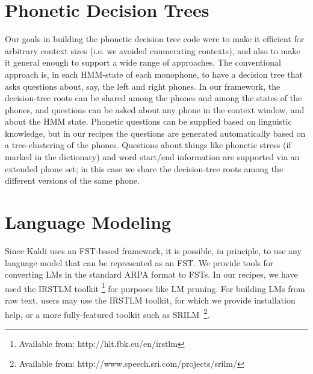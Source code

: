 \documentclass[10pt,conference,letterpaper]{IEEEtran}
\begin{document}
\section{Phonetic Decision Trees}
\label{sec:tree}
Our goals in building the phonetic decision tree code were to make it
efficient for arbitrary context sizes (i.e. we avoided enumerating
contexts), and also to make it general enough to support a wide range of
approaches.  The conventional approach is, in each HMM-state of each
monophone, to have a decision tree that asks questions about, say, 
the left and right phones.  In our framework, the decision-tree
roots can be shared among the phones and among the states of the
phones, and questions can be asked about any phone in the context window,
and about the HMM state.  Phonetic questions can be supplied based on
linguistic knowledge, but in our recipes the questions are generated
automatically based on a tree-clustering of the phones. 
Questions about things like phonetic stress (if marked in the dictionary)
and word start/end information are supported via an extended phone set;
in this case we share the decision-tree roots among the different versions of the
same phone.


\section{Language Modeling}
\label{sec:lm}
Since Kaldi uses an FST-based framework, it is possible, in principle, to use 
any language model that can be represented as an FST. 
We provide tools for converting LMs in the standard ARPA 
format to FSTs.  In our recipes, we have used the IRSTLM toolkit
\footnote{Available from: http://hlt.fbk.eu/en/irstlm} for 
purposes like LM pruning.  For building LMs from raw text, users may use the 
IRSTLM toolkit, for which we provide installation help, or a more fully-featured
toolkit such as SRILM~\footnote{Available from: http://www.speech.sri.com/projects/srilm/}.

\end{document}
